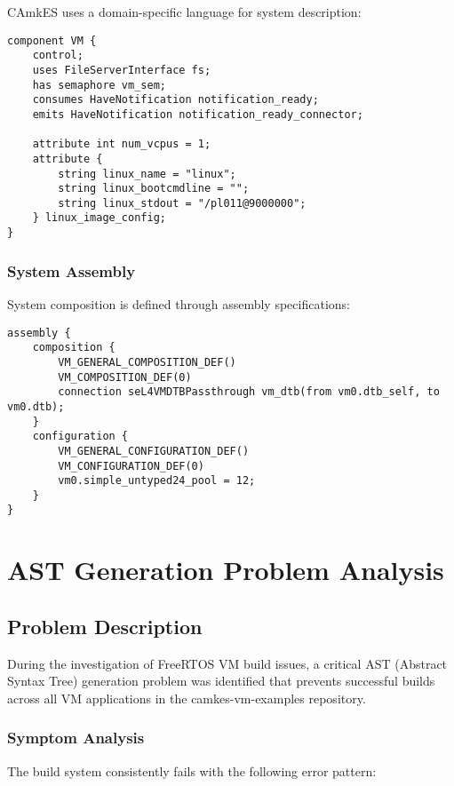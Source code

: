 \documentclass[11pt,a4paper]{article}
\begin{document}
CAmkES uses a domain-specific language for system description:

\begin{lstlisting}[caption=CAmkES Component Definition]
component VM {
    control;
    uses FileServerInterface fs;
    has semaphore vm_sem;
    consumes HaveNotification notification_ready;
    emits HaveNotification notification_ready_connector;
    
    attribute int num_vcpus = 1;
    attribute {
        string linux_name = "linux";
        string linux_bootcmdline = "";
        string linux_stdout = "/pl011@9000000";
    } linux_image_config;
}
\end{lstlisting}

\subsubsection{System Assembly}

System composition is defined through assembly specifications:

\begin{lstlisting}[caption=System Assembly]
assembly {
    composition {
        VM_GENERAL_COMPOSITION_DEF()
        VM_COMPOSITION_DEF(0)
        connection seL4VMDTBPassthrough vm_dtb(from vm0.dtb_self, to vm0.dtb);
    }
    configuration {
        VM_GENERAL_CONFIGURATION_DEF()
        VM_CONFIGURATION_DEF(0)
        vm0.simple_untyped24_pool = 12;
    }
}
\end{lstlisting}

\section{AST Generation Problem Analysis}

\subsection{Problem Description}

During the investigation of FreeRTOS VM build issues, a critical AST (Abstract Syntax Tree) generation problem was identified that prevents successful builds across all VM applications in the camkes-vm-examples repository.

\subsubsection{Symptom Analysis}

The build system consistently fails with the following error pattern:
\end{document}
